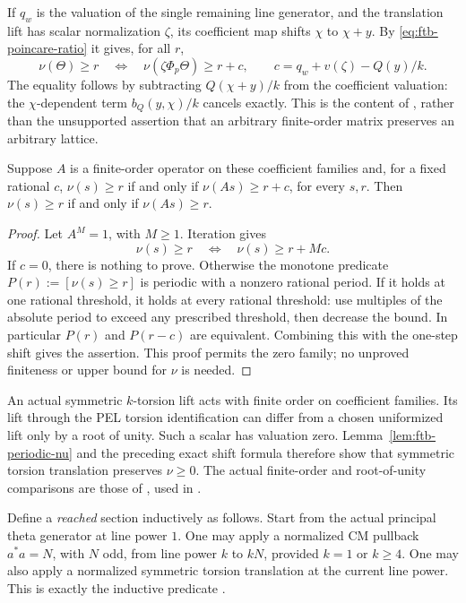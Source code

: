 If \(q_w\) is the valuation of the single remaining line generator,
and the translation lift has scalar normalization \(\zeta\), its
coefficient map shifts \(\chi\) to \(\chi+y\).
By \eqref{eq:ftb-poincare-ratio} it gives, for all \(r\),
\[
 \nu(\Theta)\ge r
 \quad\Longleftrightarrow\quad
 \nu(\zeta\Phi_p\Theta)\ge r+c,\qquad
 c=q_w+v(\zeta)-Q(y)/k .
\]
The equality follows by subtracting
\(Q(\chi+y)/k\) from the coefficient valuation:
the \(\chi\)-dependent term
\(b_Q(y,\chi)/k\) cancels exactly.
This is the content of , rather than the
unsupported assertion that an arbitrary finite-order matrix preserves
an arbitrary lattice.

\begin{srlemma}\label{lem:ftb-periodic-nu}
Suppose \(A\) is a finite-order operator on these coefficient
families and, for a fixed rational \(c\),
\(\nu(s)\ge r\) if and only if \(\nu(As)\ge r+c\), for every \(s,r\).
Then \(\nu(s)\ge r\) if and only if \(\nu(As)\ge r\).
\end{srlemma}
\begin{proof}
Let \(A^M=1\), with \(M\ge1\).
Iteration gives
\[
      \nu(s)\ge r\quad\Longleftrightarrow\quad
                              \nu(s)\ge r+Mc.
\]
If \(c=0\), there is nothing to prove.
Otherwise the monotone predicate \(P(r):=[\nu(s)\ge r]\) is periodic
with a nonzero rational period.  If it holds at one rational threshold,
it holds at every rational threshold: use multiples of the absolute
period to exceed any prescribed threshold, then decrease the bound.
In particular \(P(r)\) and \(P(r-c)\) are equivalent.
Combining this with the one-step shift gives the assertion.
This proof permits the zero family; no unproved finiteness or upper
bound for \(\nu\) is needed.
\end{proof}

An actual symmetric \(k\)-torsion lift acts with finite order on
coefficient families.
Its lift through the PEL torsion identification can differ from a
chosen uniformized lift only by a root of unity.
Such a scalar has valuation zero.
Lemma~\ref{lem:ftb-periodic-nu} and the preceding exact shift formula
therefore show that symmetric torsion translation preserves
\(\nu\ge0\).
The actual finite-order and root-of-unity comparisons are those of
, used in
.

Define a \emph{reached} section inductively as follows.
Start from the actual principal theta generator at line power \(1\).
One may apply a normalized CM pullback
\(a^*a=N\), with \(N\) odd, from line power \(k\) to \(kN\),
provided \(k=1\) or \(k\ge4\).
One may also apply a normalized symmetric torsion translation at
the current line power.
This is exactly the inductive predicate .

